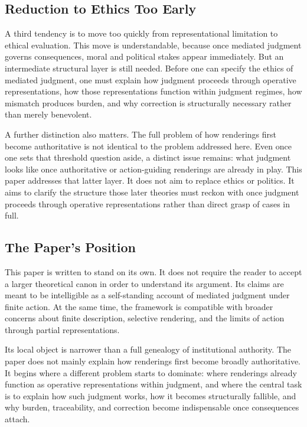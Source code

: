 \documentclass[11pt]{article}
\begin{document}
\subsection{Reduction to Ethics Too Early}

A third tendency is to move too quickly from representational limitation to ethical evaluation. This move is understandable, because once mediated judgment governs consequences, moral and political stakes appear immediately. But an intermediate structural layer is still needed. Before one can specify the ethics of mediated judgment, one must explain how judgment proceeds through operative representations, how those representations function within judgment regimes, how mismatch produces burden, and why correction is structurally necessary rather than merely benevolent.

A further distinction also matters. The full problem of how renderings first become authoritative is not identical to the problem addressed here. Even once one sets that threshold question aside, a distinct issue remains: what judgment looks like once authoritative or action-guiding renderings are already in play. This paper addresses that latter layer. It does not aim to replace ethics or politics. It aims to clarify the structure those later theories must reckon with once judgment proceeds through operative representations rather than direct grasp of cases in full.

\subsection{The Paper's Position}

This paper is written to stand on its own. It does not require the reader to accept a larger theoretical canon in order to understand its argument. Its claims are meant to be intelligible as a self-standing account of mediated judgment under finite action. At the same time, the framework is compatible with broader concerns about finite description, selective rendering, and the limits of action through partial representations.

Its local object is narrower than a full genealogy of institutional authority. The paper does not mainly explain how renderings first become broadly authoritative. It begins where a different problem starts to dominate: where renderings already function as operative representations within judgment, and where the central task is to explain how such judgment works, how it becomes structurally fallible, and why burden, traceability, and correction become indispensable once consequences attach.
\end{document}
